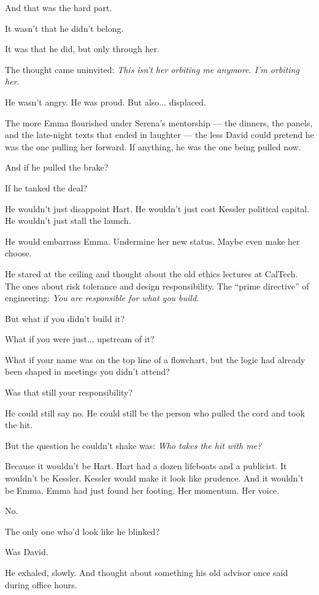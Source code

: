 And that was the hard part.

It wasn’t that he didn’t belong.

It was that he did, but only through her.

The thought came uninvited:  
\textit{This isn’t her orbiting me anymore. I’m orbiting her.}

He wasn’t angry. He was proud. But also... displaced.

The more Emma flourished under Serena’s mentorship --- the dinners, the panels, and the late-night texts that 
ended in laughter  --- 
the less David could pretend he was the one pulling her forward. If anything, he was the one being pulled now.

And if he pulled the brake?

If he tanked the deal?

He wouldn’t just disappoint Hart.  
He wouldn’t just cost Kessler political capital.  
He wouldn’t just stall the launch.

He would embarrass Emma.  
Undermine her new status.  
Maybe even make her choose.

He stared at the ceiling and thought about the old ethics lectures at CalTech.  
The ones about risk tolerance and design responsibility.  
The “prime directive” of engineering: \textit{You are responsible for what you build.}

But what if you didn’t build it?

What if you were just... upstream of it?

What if your name was on the top line of a flowchart, but the logic had already been shaped in meetings 
you didn’t attend?

Was that still your responsibility?

He could still say no.  
He could still be the person who pulled the cord and took the hit.

But the question he couldn’t shake was:  
\textit{Who takes the hit with me?}

Because it wouldn’t be Hart. Hart had a dozen lifeboats and a publicist.  
It wouldn’t be Kessler. Kessler would make it look like prudence.  
And it wouldn’t be Emma. Emma had just found her footing. Her momentum. Her voice.

No.

The only one who’d look like he blinked?

Was David.

He exhaled, slowly.  
And thought about something his old advisor once said during office hours.

